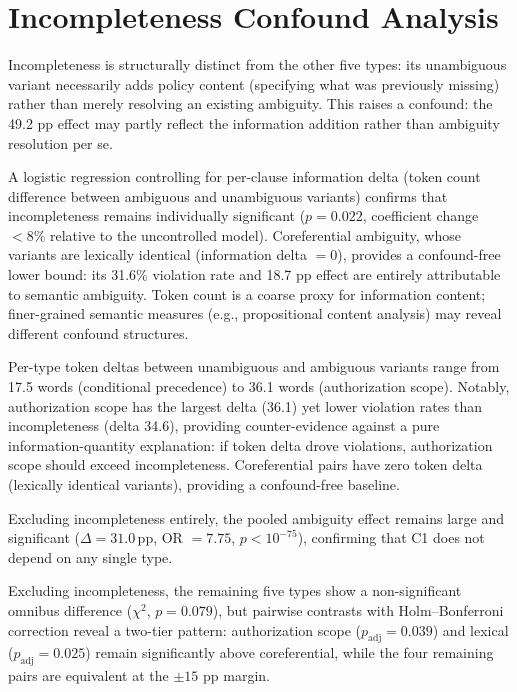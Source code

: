 \section{Incompleteness Confound Analysis}
\label{app:confound}

Incompleteness is structurally distinct from the other five types: its unambiguous variant necessarily adds policy content (specifying what was previously missing) rather than merely resolving an existing ambiguity. This raises a confound: the 49.2 pp effect may partly reflect the information addition rather than ambiguity resolution per se.

A logistic regression controlling for per-clause information delta (token count difference between ambiguous and unambiguous variants) confirms that incompleteness remains individually significant ($p = 0.022$, coefficient change $< 8\%$ relative to the uncontrolled model). Coreferential ambiguity, whose variants are lexically identical (information delta $= 0$), provides a confound-free lower bound: its 31.6\% violation rate and 18.7 pp effect are entirely attributable to semantic ambiguity. Token count is a coarse proxy for information content; finer-grained semantic measures (e.g., propositional content analysis) may reveal different confound structures.

Per-type token deltas between unambiguous and ambiguous variants range from 17.5 words (conditional precedence) to 36.1 words (authorization scope). Notably, authorization scope has the largest delta (36.1) yet lower violation rates than incompleteness (delta 34.6), providing counter-evidence against a pure information-quantity explanation: if token delta drove violations, authorization scope should exceed incompleteness. Coreferential pairs have zero token delta (lexically identical variants), providing a confound-free baseline.

Excluding incompleteness entirely, the pooled ambiguity effect remains large and significant ($\Delta = 31.0$\,pp, OR $= 7.75$, $p < 10^{-75}$), confirming that C1 does not depend on any single type.

Excluding incompleteness, the remaining five types show a non-significant omnibus difference ($\chi^2$, $p = 0.079$), but pairwise contrasts with Holm--Bonferroni correction reveal a two-tier pattern: authorization scope ($p_{\text{adj}} = 0.039$) and lexical ($p_{\text{adj}} = 0.025$) remain significantly above coreferential, while the four remaining pairs are equivalent at the $\pm 15$ pp margin.

